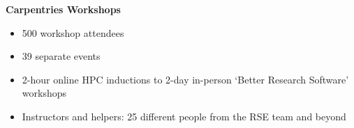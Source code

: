 \begin{frame}
				\vspace{4\baselineskip}	
{\LARGE \textbf{				Carpentries Workshops}}
	\begin{itemize}
		\item 500 workshop attendees
		\item 39 separate events
		\item 2-hour online HPC inductions to 2-day in-person ‘Better Research Software’ workshops 
		\item Instructors and helpers: 25 different people from the RSE team and beyond

		
	\end{itemize}
	\note{}
	
\end{frame}